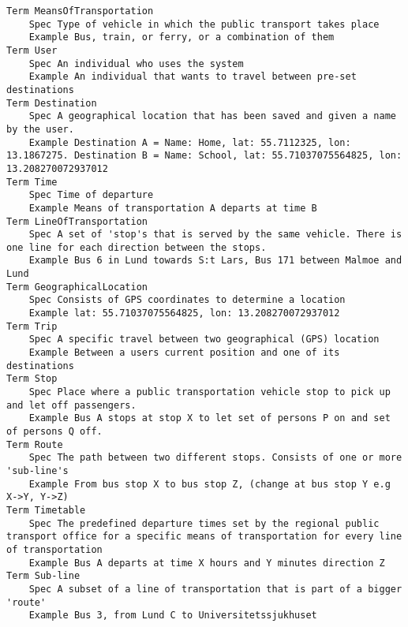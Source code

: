 

\begin{lstlisting}
Term MeansOfTransportation
	Spec Type of vehicle in which the public transport takes place
	Example Bus, train, or ferry, or a combination of them
Term User
	Spec An individual who uses the system
	Example An individual that wants to travel between pre-set destinations
Term Destination
	Spec A geographical location that has been saved and given a name by the user.
	Example Destination A = Name: Home, lat: 55.7112325, lon: 13.1867275. Destination B = Name: School, lat: 55.71037075564825, lon: 13.208270072937012
Term Time
	Spec Time of departure
	Example Means of transportation A departs at time B
Term LineOfTransportation
	Spec A set of 'stop's that is served by the same vehicle. There is one line for each direction between the stops.
	Example Bus 6 in Lund towards S:t Lars, Bus 171 between Malmoe and Lund
Term GeographicalLocation
	Spec Consists of GPS coordinates to determine a location
	Example lat: 55.71037075564825, lon: 13.208270072937012
Term Trip
	Spec A specific travel between two geographical (GPS) location
	Example Between a users current position and one of its destinations
Term Stop
	Spec Place where a public transportation vehicle stop to pick up and let off passengers.
	Example Bus A stops at stop X to let set of persons P on and set of persons Q off.
Term Route
	Spec The path between two different stops. Consists of one or more 'sub-line's
	Example From bus stop X to bus stop Z, (change at bus stop Y e.g X->Y, Y->Z)
Term Timetable
	Spec The predefined departure times set by the regional public transport office for a specific means of transportation for every line of transportation
	Example Bus A departs at time X hours and Y minutes direction Z
Term Sub-line
	Spec A subset of a line of transportation that is part of a bigger 'route'
	Example Bus 3, from Lund C to Universitetssjukhuset

\end{lstlisting}